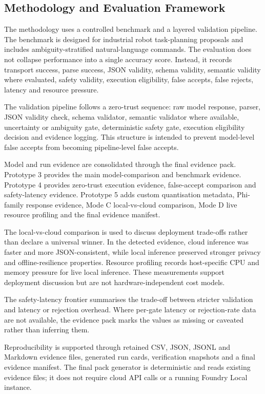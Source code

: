\documentclass[sigconf,nonacm]{acmart}
\begin{document}
\subsection{Methodology and Evaluation Framework}
\label{sec:methodology_evaluation_framework}

The methodology uses a controlled benchmark and a layered validation pipeline. The benchmark is designed for industrial robot task-planning proposals and includes ambiguity-stratified natural-language commands. The evaluation does not collapse performance into a single accuracy score. Instead, it records transport success, parse success, JSON validity, schema validity, semantic validity where evaluated, safety validity, execution eligibility, false accepts, false rejects, latency and resource pressure.

The validation pipeline follows a zero-trust sequence: raw model response, parser, JSON validity check, schema validator, semantic validator where available, uncertainty or ambiguity gate, deterministic safety gate, execution eligibility decision and evidence logging. This structure is intended to prevent model-level false accepts from becoming pipeline-level false accepts.

Model and run evidence are consolidated through the final evidence pack. Prototype 3 provides the main model-comparison and benchmark evidence. Prototype 4 provides zero-trust execution evidence, false-accept comparison and safety-latency evidence. Prototype 5 adds custom quantisation metadata, Phi-family response evidence, Mode C local-vs-cloud comparison, Mode D live resource profiling and the final evidence manifest.

The local-vs-cloud comparison is used to discuss deployment trade-offs rather than declare a universal winner. In the detected evidence, cloud inference was faster and more JSON-consistent, while local inference preserved stronger privacy and offline-resilience properties. Resource profiling records host-specific CPU and memory pressure for live local inference. These measurements support deployment discussion but are not hardware-independent cost models.

The safety-latency frontier summarises the trade-off between stricter validation and latency or rejection overhead. Where per-gate latency or rejection-rate data are not available, the evidence pack marks the values as missing or caveated rather than inferring them.

Reproducibility is supported through retained CSV, JSON, JSONL and Markdown evidence files, generated run cards, verification snapshots and a final evidence manifest. The final pack generator is deterministic and reads existing evidence files; it does not require cloud API calls or a running Foundry Local instance.
\end{document}
